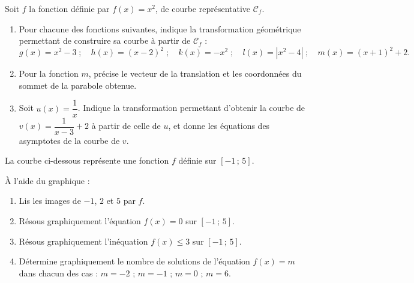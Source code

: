 \documentclass[11pt]{article}
\begin{document}
\begin{exercice}
Soit $f$ la fonction définie par $f(x)=x^{2}$, de courbe représentative $\mathcal{C}_{f}$.
\begin{enumerate}
\item Pour chacune des fonctions suivantes, indique la transformation géométrique permettant de construire sa courbe à partir de $\mathcal{C}_{f}$ :
\[ g(x)=x^{2}-3 \;;\quad h(x)=(x-2)^{2} \;;\quad k(x)=-x^{2} \;;\quad l(x)=|x^{2}-4| \;;\quad m(x)=(x+1)^{2}+2. \]
\item Pour la fonction $m$, précise le vecteur de la translation et les coordonnées du sommet de la parabole obtenue.
\item Soit $u(x)=\dfrac{1}{x}$. Indique la transformation permettant d'obtenir la courbe de $v(x)=\dfrac{1}{x-3}+2$ à partir de celle de $u$, et donne les équations des asymptotes de la courbe de $v$.
\end{enumerate}
\end{exercice}

\begin{exercice}
La courbe ci-dessous représente une fonction $f$ définie sur $[-1\,;\,5]$.
\begin{center}
\end{center}
À l'aide du graphique :
\begin{enumerate}
\item Lis les images de $-1$, $2$ et $5$ par $f$.
\item Résous graphiquement l'équation $f(x)=0$ sur $[-1\,;\,5]$.
\item Résous graphiquement l'inéquation $f(x)\leq 3$ sur $[-1\,;\,5]$.
\item Détermine graphiquement le nombre de solutions de l'équation $f(x)=m$ dans chacun des cas : $m=-2$ ; $m=-1$ ; $m=0$ ; $m=6$.
\end{enumerate}
\end{exercice}
\end{document}
